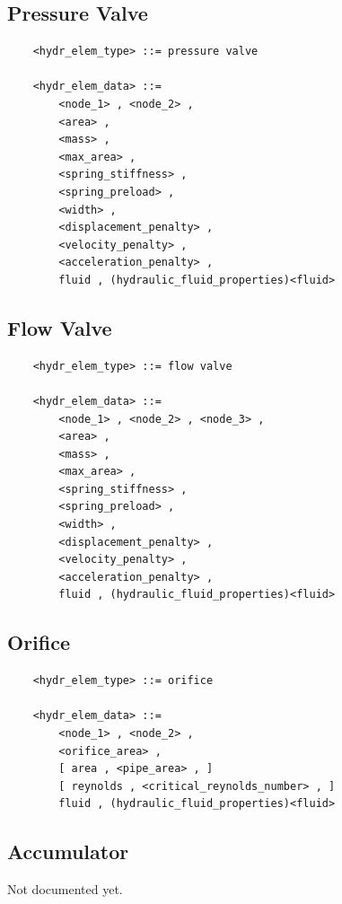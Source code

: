 \subsection{Pressure Valve}
\label{sec:EL:HYDR:PRESSURE_VALVE}
\begin{verbatim}
    <hydr_elem_type> ::= pressure valve

    <hydr_elem_data> ::=
        <node_1> , <node_2> ,
        <area> ,
        <mass> ,
        <max_area> ,
        <spring_stiffness> ,
        <spring_preload> ,
        <width> ,
        <displacement_penalty> ,
        <velocity_penalty> ,
        <acceleration_penalty> ,
        fluid , (hydraulic_fluid_properties)<fluid>
\end{verbatim}

\subsection{Flow Valve}
\label{sec:EL:HYDR:FLOW_VALVE}
\begin{verbatim}
    <hydr_elem_type> ::= flow valve

    <hydr_elem_data> ::=
        <node_1> , <node_2> , <node_3> ,
        <area> ,
        <mass> ,
        <max_area> ,
        <spring_stiffness> ,
        <spring_preload> ,
        <width> ,
        <displacement_penalty> ,
        <velocity_penalty> ,
        <acceleration_penalty> ,
        fluid , (hydraulic_fluid_properties)<fluid>
\end{verbatim}



\subsection{Orifice}
\label{sec:EL:HYDR:ORIFICE}
\begin{verbatim}
    <hydr_elem_type> ::= orifice

    <hydr_elem_data> ::=
        <node_1> , <node_2> ,
        <orifice_area> ,
        [ area , <pipe_area> , ]
        [ reynolds , <critical_reynolds_number> , ]
        fluid , (hydraulic_fluid_properties)<fluid>
\end{verbatim}



\subsection{Accumulator}
\label{sec:EL:HYDR:ACCUMULATOR}
Not documented yet.



